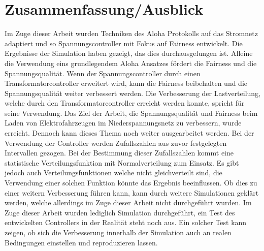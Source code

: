 \chapter{Zusammenfassung/Ausblick}
Im Zuge dieser Arbeit wurden Techniken des Aloha Protokolls auf das Stromnetz adaptiert und so Spannungscontroller mit Fokus auf Fairness entwickelt. Die Ergebnisse der Simulation haben gezeigt, das dies durchausgelungen ist. Alleine die Verwendung eins grundlegendem Aloha Ansatzes fördert die Fairness und die Spannungsqualität. Wenn der Spannungscontroller durch einen Transformatorcontroller erweitert wird, kann die Fairness beibehalten und die Spannungsqualität weiter verbessert werden. Die Verbesserung der Lastverteilung, welche durch den Transformatorcontroller erreicht werden konnte, spricht für seine Verwendung. Das Ziel der Arbeit, die Spannungsqualität und Fairness beim Laden von Elektrofahrzeugen im Niederspannungsnetz zu verbessern, wurde erreicht. Dennoch kann dieses Thema noch weiter ausgearbeitet werden. Bei der Verwendung der Controller werden Zufallszahlen aus zuvor festgelegten Intervallen gezogen. Bei der Bestimmung dieser Zufallszahlen kommt eine statistische Verteilungsfunktion mit Normalverteilung zum Einsatz. Es gibt jedoch auch Verteilungsfunktionen welche nicht gleichverteilt sind, die Verwendung einer solchen Funktion könnte das Ergebnis beeinflussen. Ob dies zu einer weitern Verbesserung führen kann, kann durch weitere Simulationen geklärt werden, welche allerdings im Zuge dieser Arbeit nicht durchgeführt wurden. Im Zuge dieser Arbeit wurden lediglich Simulation durchgeführt, ein Test des entwickelten Controllers in der Realität steht noch aus. Ein solcher Test kann zeigen, ob sich die Verbesserung innerhalb der Simulation auch an realen Bedingungen einstellen und reproduzieren lassen.

